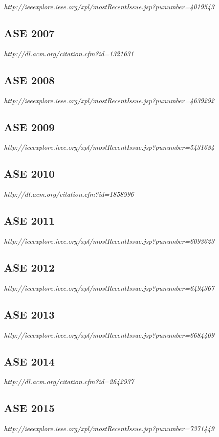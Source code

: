 {\small \em http://ieeexplore.ieee.org/xpl/mostRecentIssue.jsp?punumber=4019543}

\subsection{ASE 2007}

{\small \em http://dl.acm.org/citation.cfm?id=1321631}

\subsection{ASE 2008}

{\small \em http://ieeexplore.ieee.org/xpl/mostRecentIssue.jsp?punumber=4639292}

\subsection{ASE 2009}

{\small \em http://ieeexplore.ieee.org/xpl/mostRecentIssue.jsp?punumber=5431684}

\subsection{ASE 2010}

{\small \em http://dl.acm.org/citation.cfm?id=1858996}

\subsection{ASE 2011}

{\small \em http://ieeexplore.ieee.org/xpl/mostRecentIssue.jsp?punumber=6093623}

\subsection{ASE 2012}

{\small \em http://ieeexplore.ieee.org/xpl/mostRecentIssue.jsp?punumber=6494367}

\subsection{ASE 2013}

{\small \em http://ieeexplore.ieee.org/xpl/mostRecentIssue.jsp?punumber=6684409}

\subsection{ASE 2014}

{\small \em http://dl.acm.org/citation.cfm?id=2642937}

\subsection{ASE 2015}

{\small \em http://ieeexplore.ieee.org/xpl/mostRecentIssue.jsp?punumber=7371449}

